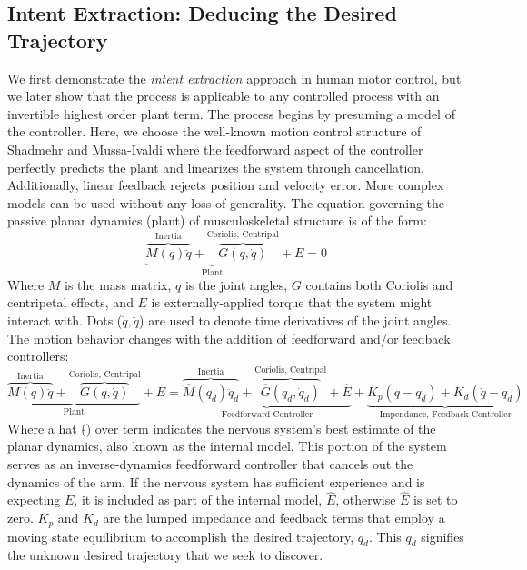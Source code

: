 \documentclass[10pt]{article}
\begin{document}
\subsection*{Intent Extraction: Deducing the Desired Trajectory}
We first demonstrate the \textit{intent extraction} approach in human motor control, but we later show that the process is applicable to any controlled process with an invertible highest order plant term. The process begins by presuming a model of the controller. Here, we choose the well-known motion control structure of Shadmehr and Mussa-Ivaldi\cite{shadmehr1994adaptive} where the feedforward aspect of the controller perfectly predicts the plant and linearizes the system through cancellation. Additionally, linear feedback rejects position and velocity error. More complex models can be used without any loss of generality. The equation governing the passive planar dynamics (plant) of musculoskeletal structure is of the form:
\begin{equation}
\underbrace{\overbrace{M(q)\ddot{q}}^{\text{Inertia}}+\overbrace{G(q,\dot{q})}^{\text{Coriolis, Centripal}}}_{\text{Plant}}+E=0
\end{equation}
Where $M$ is the mass matrix, $q$ is the joint angles, $G$ contains both Coriolis and centripetal effects, and $E$ is externally-applied torque that the system might interact with. Dots ($\dot{q}, \ddot{q}$) are used to denote time derivatives of the joint angles. The motion behavior changes with the addition of feedforward and/or feedback controllers:
\begin{equation}
\underbrace{\overbrace{M(q)\ddot{q}}^{\text{Inertia}}+\overbrace{G(q,\dot{q})}^{\text{Coriolis, Centripal}}}_{\text{Plant}}+E=\underbrace{\overbrace{\hat{M}(q_d)\ddot{q}_d}^{\text{Inertia}}+\overbrace{\hat{G}(q_d,\dot{q}_d)}^{\text{Coriolis, Centripal}}+\hat{E}}_{\text{Feedforward Controller}}+\underbrace{K_p(q-q_d)+K_d(\dot{q}-\dot{q}_d)}_{\text{Impendance, Feedback Controller}}
\end{equation}
Where a hat ($\hat{ }$) over term indicates the nervous system's best estimate of the planar dynamics, also known as the internal model. This portion of the system serves as an inverse-dynamics feedforward controller that cancels out the dynamics of the arm. If the nervous system has sufficient experience and is expecting $E$, it is included as part of the internal model, $\hat{E}$, otherwise $\hat{E}$ is set to zero. $K_p$ and $K_d$ are the lumped impedance and feedback terms that employ a moving state equilibrium to accomplish the desired trajectory, $q_d$. This $q_d$ signifies the unknown desired trajectory that we seek to discover.
\end{document}
